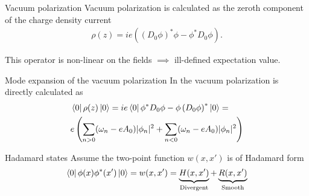 \begin{frame}{Vacuum polarization}
	Vacuum polarization is calculated as the zeroth component of the charge density current
\begin{align*}
	\rho(z) = ie \left( \left( D_0 \phi\right)^*\phi  - \phi^* D_0\phi\right).
\end{align*}

This operator is non-linear on the fields $\implies$ ill-defined expectation value. 

\end{frame}

%

\begin{frame}{Mode expansion of the vacuum polarization }
	In \cite{Ambj1983} the vacuum polarization is directly calculated as 
\begin{align*}
	\begin{split}
		&\bra{0} \rho(z) \ket{0}  = ie \bra{0}  \phi^* D_0\phi- \phi \left( D_0\phi \right) ^*  \ket{0} = \\
					 &	e \left( 
		    			 \sum_{n>0}^{} (\omega_n - eA_0) \lvert \phi_n  \rvert ^2
					+\sum_{n<0}^{} (\omega_n - eA_0) \lvert \phi_n  \rvert ^2
		    		\right)
	\end{split}
\end{align*}
\end{frame}

\begin{frame}{Hadamard states}
	Assume the two-point function $w(x, x')$ is of Hadamard form
\begin{align*}
	\bra{0} \phi(x)\phi^*(x') \ket{0} = w(x, x') = \underbrace{H(x, x')}_\text{Divergent}+ \underbrace{R(x, x')}_\text{Smooth}
\end{align*}


\end{frame}


